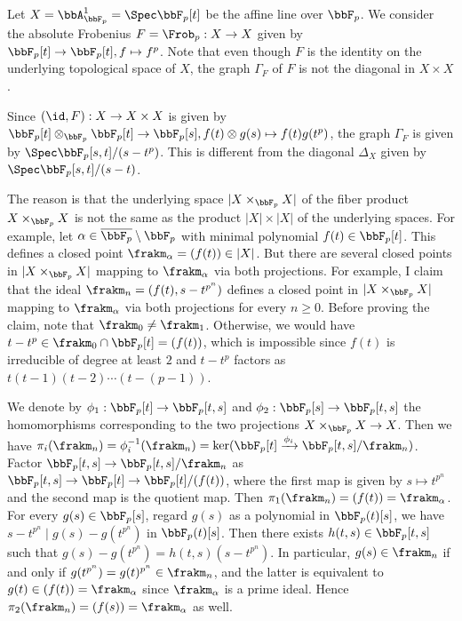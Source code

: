   \begin{example}
    Let $X = \bbA^1_{\bbF_p} = \Spec \bbF_p[t]$ be the affine line over $\bbF_p$.
    We consider the absolute Frobenius $F = \Frob_p: X \to X$ given by $\bbF_p[t] \to \bbF_p[t], f \mapsto f^p$.
    Note that even though $F$ is the identity on the underlying topological space of $X$, the graph $\Gamma_F$ of $F$ is not the diagonal in $X \times X$.
    
    Since $(\id,F): X \to X \times X$ is given by $\bbF_p[t] \otimes_{\bbF_p} \bbF_p[t] \to \bbF_p[s], f(t) \otimes g(s) \mapsto f(t) g(t^p)$, the graph $\Gamma_F$ is given by $\Spec \bbF_p[s,t]/(s - t^p)$.
    This is different from the diagonal $\Delta_X$ given by $\Spec \bbF_p[s,t]/(s-t)$.
     
    The reason is that the underlying space $|X \times_{\bbF_p} X|$ of the fiber product $X \times_{\bbF_p} X$ is not the same as the product $|X| \times |X|$ of the underlying spaces.
    For example, let $\alpha \in \overline{\bbF_p} \setminus \bbF_p$ with minimal polynomial $f(t) \in \bbF_p[t]$.
    This defines a closed point $\frakm_\alpha = (f(t)) \in |X|$.
    But there are several closed points in $|X \times_{\bbF_p} X|$ mapping to $\frakm_\alpha$ via both projections.
    For example, I claim that the ideal $\frakm_n = (f(t), s-t^{p^n})$ defines a closed point in $|X \times_{\bbF_p} X|$ mapping to $\frakm_\alpha$ via both projections for every $n \geq 0$.
    Before proving the claim, note that $\frakm_0 \neq \frakm_1$.
    Otherwise, we would have $t-t^p \in \frakm_0 \cap \bbF_p[t] = (f(t))$, which is impossible since $f(t)$ is irreducible of degree at least $2$ and $t-t^p$ factors as $t(t-1)(t-2) \cdots (t-(p-1))$.

    We denote by $\phi_1: \bbF_p[t] \to \bbF_p[t,s]$ and $\phi_2: \bbF_p[s] \to \bbF_p[t,s]$ the homomorphisms corresponding to the two projections $X \times_{\bbF_p} X \to X$.
    Then we have $\pi_i(\frakm_n) = \phi_i^{-1}(\frakm_n) = \ker(\bbF_p[t] \xrightarrow{\phi_i} \bbF_p[t,s]/\frakm_n)$.
    Factor $\bbF_p[t,s] \to \bbF_p[t,s]/\frakm_n$ as $\bbF_p[t,s] \to \bbF_p[t] \to \bbF_p[t]/(f(t))$, where the first map is given by $s \mapsto t^{p^n}$ and the second map is the quotient map.
    Then $\pi_1(\frakm_n) = (f(t)) = \frakm_\alpha$.
    For every $g(s) \in \bbF_p[s]$, regard $g(s)$ as a polynomial in $\bbF_p(t)[s]$, we have $s-t^{p^n} \mid g(s) - g(t^{p^n})$ in $\bbF_p(t)[s]$.
    Then there exists $h(t,s) \in \bbF_p[t,s]$ such that $g(s) - g(t^{p^n}) = h(t,s)(s-t^{p^n})$.
    In particular, $g(s) \in \frakm_n$ if and only if $g(t^{p^n}) = g(t)^{p^n} \in \frakm_n$, and the latter is equivalent to $g(t) \in (f(t)) = \frakm_\alpha$ since $\frakm_\alpha$ is a prime ideal.
    Hence $\pi_2(\frakm_n) = (f(s)) = \frakm_\alpha$ as well.
  \end{example}
  
